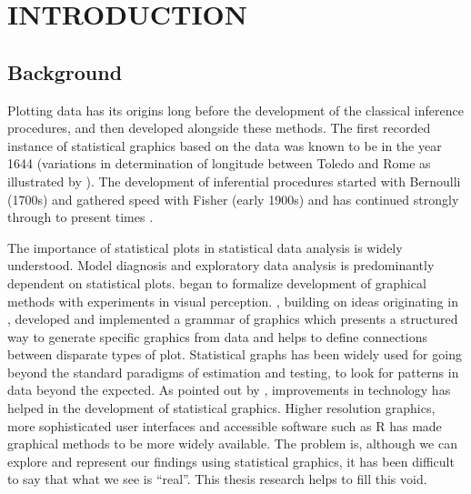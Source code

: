\chapter{INTRODUCTION}\label{ch:introduction}


\section{Background}

Plotting data has its origins long before the development of the classical inference procedures, and then developed alongside these methods. The first recorded instance of statistical graphics based on the data was known to be in the year 1644 (variations in determination of longitude between Toledo and Rome as illustrated by \cite{friendly:2001}). The development of inferential procedures started with Bernoulli (1700s) and gathered speed with Fisher (early 1900s) and has continued strongly through to present times \citep{hald:2004}. 

The importance of statistical plots in statistical data analysis is widely understood. Model diagnosis and exploratory data analysis is predominantly dependent on statistical plots. \cite{cleveland:1984} began to formalize development of graphical methods with experiments in visual perception. \cite{hadley:2009}, building on ideas originating in \cite{wilkinson:1999}, developed and implemented a grammar of graphics which presents a structured way to generate specific graphics from data and helps to define connections between disparate types of plot. Statistical graphs has been widely used for going beyond the standard paradigms of estimation and testing, to look for patterns in data beyond the expected. As pointed out by \cite{gelman:2004}, improvements in technology has helped in the development of statistical graphics. Higher resolution graphics, more sophisticated user interfaces and accessible software such as R \citep{r} has made graphical methods to be more widely available.  The problem is, although we can explore and represent our findings using statistical graphics, it has been difficult to say that what we see is ``real''. This thesis research helps to fill this void.


